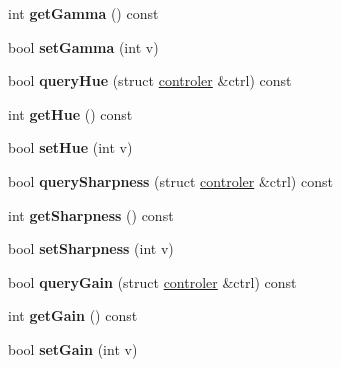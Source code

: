\begin{DoxyCompactItemize}
\item 
int {\bfseries get\+Gamma} () const \hypertarget{classCamera_a42f221c5b69fd2157fba7bca438a9151}{}\label{classCamera_a42f221c5b69fd2157fba7bca438a9151}

\item 
bool {\bfseries set\+Gamma} (int v)\hypertarget{classCamera_a6d57aa6355e38f991f41e34a3dffd9f4}{}\label{classCamera_a6d57aa6355e38f991f41e34a3dffd9f4}

\item 
bool {\bfseries query\+Hue} (struct \hyperlink{structcontroler}{controler} \&ctrl) const \hypertarget{classCamera_a3388f9b4a2f25294f0ccfb76366064e7}{}\label{classCamera_a3388f9b4a2f25294f0ccfb76366064e7}

\item 
int {\bfseries get\+Hue} () const \hypertarget{classCamera_a2c9882d9c49fc045ed92715fb1cf14b5}{}\label{classCamera_a2c9882d9c49fc045ed92715fb1cf14b5}

\item 
bool {\bfseries set\+Hue} (int v)\hypertarget{classCamera_acb72648ceadd8eb336e560c705ee9a64}{}\label{classCamera_acb72648ceadd8eb336e560c705ee9a64}

\item 
bool {\bfseries query\+Sharpness} (struct \hyperlink{structcontroler}{controler} \&ctrl) const \hypertarget{classCamera_a5fb0094f6a5f42f81525b8d33a10dca8}{}\label{classCamera_a5fb0094f6a5f42f81525b8d33a10dca8}

\item 
int {\bfseries get\+Sharpness} () const \hypertarget{classCamera_af9a93c5376f5c4176538bd12c32c2056}{}\label{classCamera_af9a93c5376f5c4176538bd12c32c2056}

\item 
bool {\bfseries set\+Sharpness} (int v)\hypertarget{classCamera_a09c967ad56e7494645069831d5072c9a}{}\label{classCamera_a09c967ad56e7494645069831d5072c9a}

\item 
bool {\bfseries query\+Gain} (struct \hyperlink{structcontroler}{controler} \&ctrl) const \hypertarget{classCamera_abb8b7edb37093b3e17b7bd72a4ffec3e}{}\label{classCamera_abb8b7edb37093b3e17b7bd72a4ffec3e}

\item 
int {\bfseries get\+Gain} () const \hypertarget{classCamera_a356e28df754467e045ad95e6a0fc03c6}{}\label{classCamera_a356e28df754467e045ad95e6a0fc03c6}

\item 
bool {\bfseries set\+Gain} (int v)\hypertarget{classCamera_a376d26c986bd1c12ea48c6eeb1f20d6a}{}\label{classCamera_a376d26c986bd1c12ea48c6eeb1f20d6a}


\end{DoxyCompactItemize}
